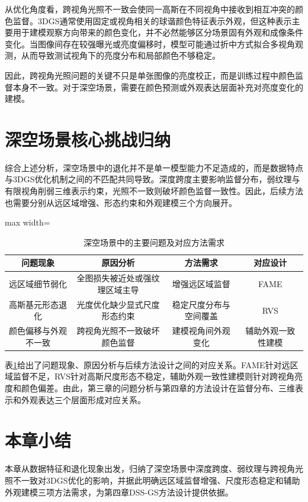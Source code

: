 从优化角度看，跨视角光照不一致会使同一高斯在不同视角中接收到相互冲突的颜色监督。3DGS通常使用固定或视角相关的球谐颜色特征表示外观，但这种表示主要用于建模观察方向带来的颜色变化，并不必然能够区分场景固有外观和成像条件变化。当图像间存在较强曝光或亮度偏移时，模型可能通过折中方式拟合多视角观测，从而导致测试视角下的亮度分布和局部颜色不够稳定。

因此，跨视角光照问题的关键不只是单张图像的亮度校正，而是训练过程中颜色监督本身不一致。对于深空场景，需要在颜色预测或外观表达层面补充对亮度变化的建模。

\section{深空场景核心挑战归纳}

综合上述分析，深空场景中的退化并不是单一模型能力不足造成的，而是数据特点与3DGS优化机制之间的不匹配共同导致。深度跨度主要影响监督分布，弱纹理与有限视角削弱三维表示约束，光照不一致则破坏颜色监督一致性。因此，后续方法也需要分别从远区域增强、形态约束和外观建模三个方向展开。

\begin{table}[H]
    \fontsize{10.5pt}{13.125pt}\selectfont
    \caption{深空场景中的主要问题及对应方法需求}
    \centering\label{tab:3-1}
    \begin{adjustbox}{max width=\textwidth}
    \begin{tabular}{cccc}
        \toprule
        问题现象 & 原因分析 & 方法需求 & 对应设计 \\
        \midrule
        远区域细节弱化 & 全图损失被近处或强纹理区域主导 & 增强远区域监督 & FAME \\
        高斯基元形态退化 & 光度优化缺少显式尺度形态约束 & 稳定尺度分布与空间覆盖 & RVS \\
        颜色偏移与外观不一致 & 跨视角光照不一致破坏颜色监督 & 建模视角间外观变化 & 辅助外观一致性建模 \\
        \bottomrule
    \end{tabular}
    \end{adjustbox}
\end{table}

表\ref{tab:3-1}给出了问题现象、原因分析与后续方法设计之间的对应关系。FAME针对远区域监督不足，RVS针对高斯尺度形态不稳定，辅助外观一致性建模则针对跨视角亮度和颜色偏差。由此，第三章的问题分析与第四章的方法设计在监督分布、三维表示和外观表达三个层面形成对应关系。

\section{本章小结}

本章从数据特征和退化现象出发，归纳了深空场景中深度跨度、弱纹理与跨视角光照不一致对3DGS优化的影响，并据此明确远区域监督增强、尺度形态稳定和辅助外观建模三项方法需求，为第四章DSS-GS方法设计提供依据。
